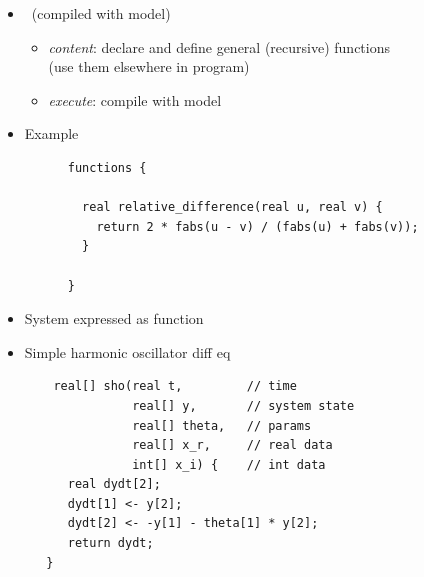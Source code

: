 \documentclass[10pt]{report}
\begin{document}
\begin{itemize}
\item {} \ (compiled with model)
  \vspace*{-4pt}
  \begin{itemize}\small
  \item {\slshape content}: declare and define general (recursive) functions
    \\
    {\small (use them elsewhere in program)}
  \item {\slshape execute}: compile with model
  \end{itemize}
  \vspace*{6pt}
\item Example
  \\[6pt]
  \begin{minipage}[t]{0.8\textwidth}
    \footnotesize
    \begin{Verbatim}
      functions {

        real relative_difference(real u, real v) {
          return 2 * fabs(u - v) / (fabs(u) + fabs(v));
        }

      }
    \end{Verbatim}
  \end{minipage}
\end{itemize}

\begin{itemize}
\item System expressed as function
\item Simple harmonic oscillator diff eq
{\footnotesize
\begin{Verbatim}
    real[] sho(real t,         // time
               real[] y,       // system state
               real[] theta,   // params
               real[] x_r,     // real data
               int[] x_i) {    // int data
      real dydt[2];
      dydt[1] <- y[2];
      dydt[2] <- -y[1] - theta[1] * y[2];
      return dydt;
   }
\end{Verbatim}
}
\end{itemize}
\end{document}
